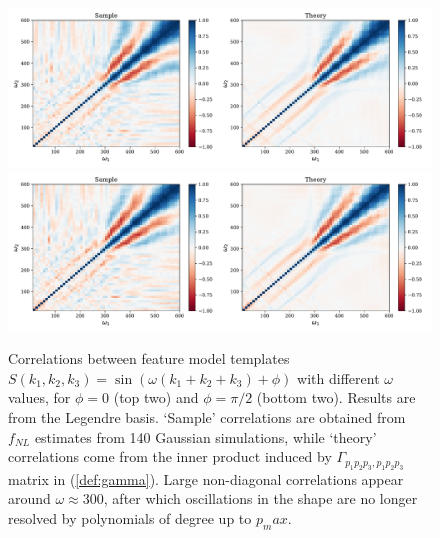 \documentclass[a4paper,12pt,times,custombib,print,index]{Classes/PhDThesisPSnPDF} %
\providecommand{\DIFadd}[1]{{\protect\color{blue}\uwave{#1}}} %
\providecommand{\DIFdel}[1]{{\protect\color{red}\sout{#1}}}                      %
\providecommand{\DIFaddFL}[1]{\DIFadd{#1}} %
\providecommand{\DIFdelFL}[1]{\DIFdel{#1}} %
\providecommand{\DIFaddbeginFL}{} %
\providecommand{\DIFaddendFL}{} %
\providecommand{\DIFdelbeginFL}{} %
\providecommand{\DIFdelendFL}{} %
\newcommand{\DIFscaledelfig}{0.5}
\newlength{\DIFdelgraphicswidth} %
\newlength{\DIFdelgraphicsheight} %
\newcommand{\DIFaddincludegraphics}[2][]{{\color{blue}\fbox{\DIFOincludegraphics[#1]{#2}}}} %
\newcommand{\DIFdelincludegraphics}[2][]{%
\sbox{\DIFdelgraphicsbox}{\DIFOincludegraphics[#1]{#2}}%
\settoboxwidth{\DIFdelgraphicswidth}{\DIFdelgraphicsbox} %
\settoboxtotalheight{\DIFdelgraphicsheight}{\DIFdelgraphicsbox} %
\scalebox{\DIFscaledelfig}{%
\parbox[b]{\DIFdelgraphicswidth}{\usebox{\DIFdelgraphicsbox}\\[-\baselineskip] \rule{\DIFdelgraphicswidth}{0em}}\llap{\resizebox{\DIFdelgraphicswidth}{\DIFdelgraphicsheight}{%
\setlength{\unitlength}{\DIFdelgraphicswidth}%
\begin{picture}(1,1)%
\thicklines\linethickness{2pt} %
{\color[rgb]{1,0,0}\put(0,0){\framebox(1,1){}}}%
{\color[rgb]{1,0,0}\put(0,0){\line( 1,1){1}}}%
{\color[rgb]{1,0,0}\put(0,1){\line(1,-1){1}}}%
\end{picture}%
}\hspace*{3pt}}} %
} %
\DeclareRobustCommand{\DIFaddbeginFL}{\DIFOaddbeginFL \let\includegraphics\DIFaddincludegraphics} %
\DeclareRobustCommand{\DIFaddendFL}{\DIFOaddendFL \let\includegraphics\DIFOincludegraphics} %
\DeclareRobustCommand{\DIFdelbeginFL}{\DIFOdelbeginFL \let\includegraphics\DIFdelincludegraphics} %
\DeclareRobustCommand{\DIFdelendFL}{\DIFOaddendFL \let\includegraphics\DIFOincludegraphics} %
\begin{document}
\begin{figure}[htbp!] 
	\centering    
	\includegraphics[width=\textwidth]{sine_template_correlations_new.pdf}
	\includegraphics[width=\textwidth]{cosine_template_correlations_new.pdf}
	\caption{Correlations between feature model templates $S(k_1,k_2,k_3)=\sin(\omega (k_1 + k_2 + k_3) + \phi)$ with different $\omega$ values, for $\phi = 0$ (top two) and $\phi = \pi/2$ (bottom two). Results are from the Legendre basis. `Sample' correlations are obtained from \DIFdelbeginFL \DIFdelFL{$f_{NL}$ }\DIFdelendFL \DIFaddbeginFL \DIFaddFL{$f_\text{NL}$ }\DIFaddendFL estimates from 140 Gaussian simulations, while `theory' correlations come from the inner product induced by $\Gamma_{p_1 p_2 p_3, p_1 p_2 p_3}$ matrix in (\ref{def:gamma}). Large non-diagonal correlations appear around $\omega \approx 300$, after which oscillations in the shape are no longer resolved by polynomials of degree up to \DIFdelbeginFL \DIFdelFL{$p_max$}\DIFdelendFL \DIFaddbeginFL \DIFaddFL{$p_\textrm{max}$}\DIFaddendFL .}
	\label{fig:feature_template_correlations}
\end{figure}
\end{document}
